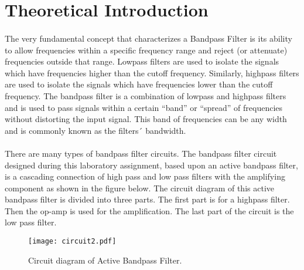 \section{Theoretical Introduction}
\label{sec:theoretical}

\paragraph{}The very fundamental concept that characterizes a Bandpass Filter is its ability to allow frequencies within a specific frequency range and reject (or attenuate) frequencies outside that range. Lowpass filters are used to isolate the signals which have frequencies higher than the cutoff frequency. Similarly, highpass filters are used to isolate the signals which have frequencies lower than the cutoff frequency. The bandpass filter is a combination of lowpass and highpass filters and is used to pass signals within a certain “band” or “spread” of frequencies without distorting the input signal. This band of frequencies can be any width and is commonly known as the filters´ bandwidth.

\paragraph{}There are many types of bandpass filter circuits. The bandpass filter circuit designed during this laboratory assignment, based upon an active bandpass filter, is a cascading connection of high pass and low pass filters with the amplifying component as shown in the figure below. The circuit diagram of this active bandpass filter is divided into three parts. The first part is for a highpass filter. Then the op-amp is used for the amplification. The last part of the circuit is the low pass filter.


\begin{figure}[H] \centering
	\texttt{[image: circuit2.pdf]}
	\caption{Circuit diagram of Active Bandpass Filter.}
	\label{fig:circuit2}
\end{figure}



